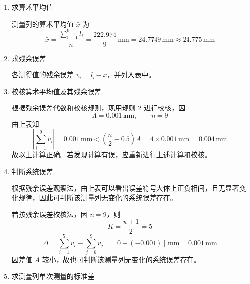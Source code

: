 \documentclass[UTF8,zihao=-4]{ctexart}
\begin{document}
\begin{enumerate}[label=\arabic*.]
    \item 求算术平均值

    测量列的算术平均值 $\bar{x}$ 为
    \begin{equation*}
        \bar{x}
        =
        \frac{\displaystyle\sum_{i=1}^{9}l_i}{n}
        =
        \frac{222.974}{9}\,\mathrm{mm}
        =
        24.7749\,\mathrm{mm}
        \approx24.775\,\mathrm{mm}
    \end{equation*}

    \item 求残余误差

    各测得值的残余误差 $v_i=l_i-\bar{x}$，并列入表中。
\newpage
    \item 校核算术平均值及其残余误差

    根据残余误差代数和校核规则，现用规则 $2$ 进行校核，因
    \begin{equation*}
        A=0.001\,\mathrm{mm},\qquad n=9
    \end{equation*}
    由上表知
    \begin{equation*}
        \left|\sum_{i=1}^{9}v_i\right|
        =
        0.001\,\mathrm{mm}
        <
        \left(\frac{n}{2}-0.5\right)A
        =
        4\times0.001\,\mathrm{mm}
        =
        0.004\,\mathrm{mm}
    \end{equation*}
    故以上计算正确。若发现计算有误，应重新进行上述计算和校核。

    \item 判断系统误差

    根据残余误差观察法，由上表可以看出误差符号大体上正负相间，且无显著变化规律，因此可判断该测量列无变化的系统误差存在。

    若按残余误差校核法，因 $n=9$，则
    \begin{equation*}
        K=\frac{n+1}{2}=5
    \end{equation*}
    \begin{equation*}
        \Delta
        =
        \sum_{i=1}^{5}v_i-\sum_{j=6}^{9}v_j
        =
        [0-(-0.001)]\,\mathrm{mm}
        =
        0.001\,\mathrm{mm}
    \end{equation*}
    因差值 $A$ 较小，故也可判断该测量列无变化的系统误差存在。

    \item 求测量列单次测量的标准差


\end{enumerate}
\end{document}
